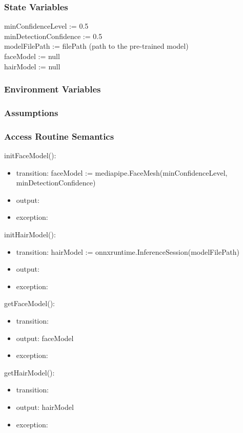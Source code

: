 \documentclass[12pt, titlepage]{article}
\begin{document}
\subsubsection{State Variables}
minConfidenceLevel := 0.5 \\
minDetectionConfidence := 0.5 \\
modelFilePath := filePath (path to the pre-trained model) \\
faceModel := null \\
hairModel := null


\subsubsection{Environment Variables}

\subsubsection{Assumptions}

\subsubsection{Access Routine Semantics}
\noindent initFaceModel():
\begin{itemize}
\item transition: faceModel := mediapipe.FaceMesh(minConfidenceLevel, minDetectionConfidence)
\item output: 
\item exception:
\end{itemize}

\noindent initHairModel():
\begin{itemize}
\item transition: 
hairModel := onnxruntime.InferenceSession(modelFilePath) \\
\item output: 
\item exception: 
\end{itemize}

\noindent getFaceModel():
\begin{itemize}
\item transition:
\item output: faceModel
\item exception:
\end{itemize}

\noindent getHairModel():
\begin{itemize}
\item transition:
\item output: hairModel
\item exception: 
\end{itemize}
\end{document}
